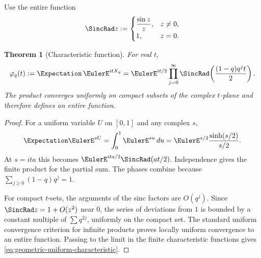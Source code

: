 \documentclass[11pt,a4paper,oneside,openany]{book}
\newtheorem{theorem}{Theorem}[chapter]
\theoremstyle{definition}
\theoremstyle{remark}
\begin{document}
Use the entire function
\[
 \SincRad z:=
 \begin{cases}
  \dfrac{\sin z}{z},&z\ne0,\\
  1,&z=0.
 \end{cases}
\]

\begin{theorem}[Characteristic function]\label{thm:geometric-uniform-characteristic}
For real $t$,
\begin{equation}\label{eq:geometric-uniform-characteristic}
 \varphi_q(t):=\Expectation\,\EulerE^{itX_q}
 =\EulerE^{it/2}\prod_{j=0}^{\infty}
 \SincRad\!\left(\frac{(1-q)q^jt}{2}\right).
\end{equation}
The product converges uniformly on compact subsets of the complex $t$-plane and therefore defines an entire function.
\end{theorem}

\begin{proof}
For a uniform variable $U$ on $[0,1]$ and any complex $s$,
\[
 \Expectation \EulerE^{sU}=\int_0^1\EulerE^{su}\,du
 =\EulerE^{s/2}\frac{\sinh(s/2)}{s/2}.
\]
At $s=ita$ this becomes
$\EulerE^{ita/2}\SincRad(at/2)$.  Independence gives the finite product for the partial sum.  The phases combine because
$\sum_{j\ge0}(1-q)q^j=1$.

For compact $t$-sets, the arguments of the sinc factors are $O(q^j)$.  Since
$\SincRad z=1+O(z^2)$ near $0$, the series of deviations from $1$ is bounded by a constant multiple of $\sum q^{2j}$, uniformly on the compact set.  The standard uniform convergence criterion for infinite products proves locally uniform convergence to an entire function.  Passing to the limit in the finite characteristic functions gives \eqref{eq:geometric-uniform-characteristic}.
\end{proof}
\end{document}
